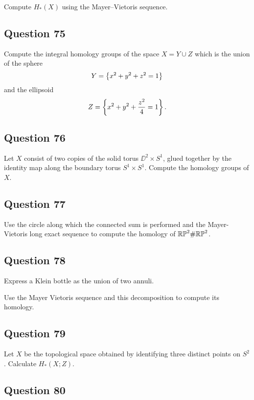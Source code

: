 \documentclass[12pt]{article}
\begin{document}
Compute \(H_* (X)\) using the Mayer--Vietoris sequence.

\hypertarget{question-75-3}{%
\subsection{Question 75}\label{question-75-3}}

Compute the integral homology groups of the space \(X = Y \cup Z\) which
is the union of the sphere \[
Y = \left\{{x^2 + y^2 + z^2 = 1}\right\}
\] and the ellipsoid \[
Z =  \left\{{x^2 + y^2 + {z^2 \over 4} = 1}\right\}
.\]

\hypertarget{question-76-3}{%
\subsection{Question 76}\label{question-76-3}}

Let \(X\) consist of two copies of the solid torus \(\DD^2 \times S^1\),
glued together by the identity map along the boundary torus
\(S^1 \times S^1\). Compute the homology groups of \(X\).

\hypertarget{question-77-3}{%
\subsection{Question 77}\label{question-77-3}}

Use the circle along which the connected sum is performed and the
Mayer-Vietoris long exact sequence to compute the homology of
\({\mathbb{RP}}^2 \# {\mathbb{RP}}^2\).

\hypertarget{question-78-3}{%
\subsection{Question 78}\label{question-78-3}}

Express a Klein bottle as the union of two annuli.

Use the Mayer Vietoris sequence and this decomposition to compute its
homology.

\hypertarget{question-79-3}{%
\subsection{Question 79}\label{question-79-3}}

Let \(X\) be the topological space obtained by identifying three
distinct points on \(S^2\). Calculate \(H_* (X; Z)\).

\hypertarget{question-80-3}{%
\subsection{Question 80}\label{question-80-3}}
\end{document}
